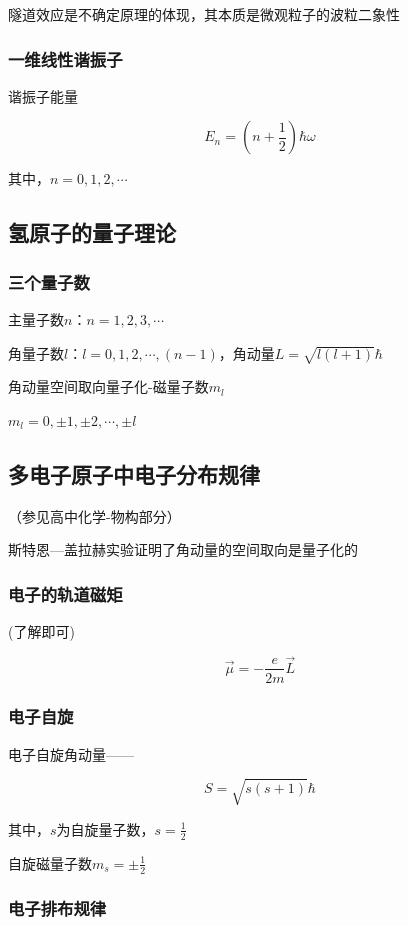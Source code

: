 \documentclass{ctexart}
\begin{document}
隧道效应是不确定原理的体现，其本质是微观粒子的波粒二象性

\subsubsection{一维线性谐振子}

谐振子能量
    
$$E_n=(n+\frac{1}{2})\hbar \omega$$

其中，$n=0,1,2,\cdots$

\subsection{氢原子的量子理论}

\subsubsection{三个量子数}

主量子数$n$：$n=1,2,3,\cdots$

角量子数$l$：$l=0,1,2,\cdots,(n-1)$，角动量$L=\sqrt{l(l+1)}\hbar$

角动量空间取向量子化-磁量子数$m_l$

$m_l=0,\pm 1,\pm 2,\cdots,\pm l$

\subsection{多电子原子中电子分布规律}

（参见高中化学-物构部分）

斯特恩—盖拉赫实验证明了角动量的空间取向是量子化的

\subsubsection{电子的轨道磁矩}

(了解即可)

$$\vec{\mu}=-\frac{e}{2m}\vec{L}$$

\subsubsection{电子自旋}

电子自旋角动量——

$$S=\sqrt{s(s+1)}\hbar$$

其中，$s$为自旋量子数，$s=\frac{1}{2}$

自旋磁量子数$m_s=\pm \frac{1}{2}$

\subsubsection{电子排布规律}
\end{document}
